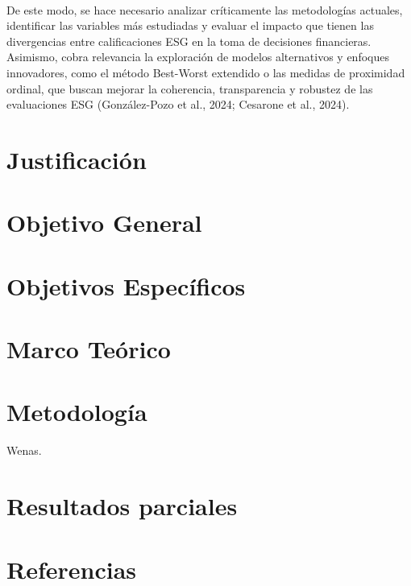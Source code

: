 \documentclass[12pt,a4paper]{article}
\begin{document}
\\
De este modo, se hace necesario analizar críticamente las metodologías actuales, identificar las variables más estudiadas y evaluar el impacto que tienen las divergencias entre calificaciones ESG en la toma de decisiones financieras. Asimismo, cobra relevancia la exploración de modelos alternativos y enfoques innovadores, como el método Best-Worst extendido o las medidas de proximidad ordinal, que buscan mejorar la coherencia, transparencia y robustez de las evaluaciones ESG (González-Pozo et al., 2024; Cesarone et al., 2024).
\section{Justificación}

\section{Objetivo General}
\section{Objetivos Específicos}


\section{Marco Teórico}
\section{Metodología}

Wenas.

\section{Resultados parciales}
\section{Referencias}
\end{document}
